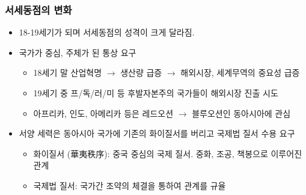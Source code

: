 \subsubsection*{서세동점의 변화}
\begin{itemize}
    \item 18-19세기가 되며 서세동점의 성격이 크게 달라짐.
    \item 국가가 중심, 주체가 된 통상 요구
    \begin{itemize}
        \item 18세기 말 산업혁명 $\rightarrow$ 생산량 급증 $\rightarrow$ 해외시장, 세계무역의 중요성 급증
        \item 19세기 중 프/독/러/미 등 후발자본주의 국가들이 해외시장 진출 시도
        \item 아프리카, 인도, 아메리카 등은 레드오션 $\rightarrow$ 블루오션인 동아시아에 관심
    \end{itemize}
    \item 서양 세력은 동아시아 국가에 기존의 화이질서를 버리고 국제법 질서 수용 요구
    \begin{itemize}
        \item 화이질서 (華夷秩序): 중국 중심의 국제 질서. 중화, 조공, 책봉으로 이루어진 관계
        \item 국제법 질서: 국가간 조약의 체결을 통하여 관계를 규율
    \end{itemize}
\end{itemize}

